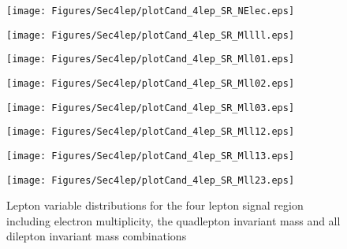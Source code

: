 \begin{figure}[!htbp]
  \begin{minipage}[h]{0.5\textwidth}
    \centering \texttt{[image: Figures/Sec4lep/plotCand\_4lep\_SR\_NElec.eps]}
  \end{minipage}\hfill
  \begin{minipage}[h]{0.5\textwidth}
    \centering \texttt{[image: Figures/Sec4lep/plotCand\_4lep\_SR\_Mllll.eps]}
  \end{minipage}\hfill
  \begin{minipage}[h]{0.5\textwidth}
    \centering \texttt{[image: Figures/Sec4lep/plotCand\_4lep\_SR\_Mll01.eps]}
  \end{minipage}\hfill
  \begin{minipage}[h]{0.5\textwidth}
    \centering \texttt{[image: Figures/Sec4lep/plotCand\_4lep\_SR\_Mll02.eps]}
  \end{minipage}\hfill
  \begin{minipage}[h]{0.5\textwidth}
    \centering \texttt{[image: Figures/Sec4lep/plotCand\_4lep\_SR\_Mll03.eps]}
  \end{minipage}\hfill
  \begin{minipage}[h]{0.5\textwidth}
    \centering \texttt{[image: Figures/Sec4lep/plotCand\_4lep\_SR\_Mll12.eps]}
  \end{minipage}\hfill
 \begin{minipage}[h]{0.5\textwidth}
    \centering \texttt{[image: Figures/Sec4lep/plotCand\_4lep\_SR\_Mll13.eps]}
  \end{minipage}\hfill
  \begin{minipage}[h]{0.5\textwidth}
    \centering \texttt{[image: Figures/Sec4lep/plotCand\_4lep\_SR\_Mll23.eps]}
  \end{minipage}\hfill
  \caption{ Lepton variable distributions for the four lepton signal region including electron multiplicity, the quadlepton invariant mass and all dilepton invariant mass combinations } 
  \label{fig:4lSR_leps}
\end{figure}

